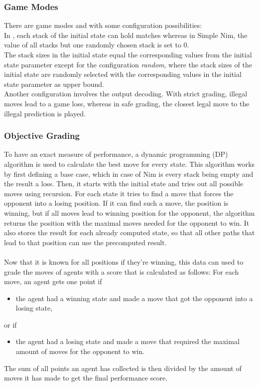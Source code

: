 \documentclass[11pt]{report}
\begin{document}
\begin{enumerate}
    \subsubsection{Game Modes}
    There are game modes  and  with some configuration possibilities:
    \\
    In , each stack of the initial state can hold matches whereas in Simple Nim, the value of all stacks but one randomly chosen stack is set to 0.
    \\
    The stack sizes in the initial state equal the corresponding values from the initial state parameter except for the configuration \textit{random}, where the stack sizes of the initial state are randomly selected with the corresponding values in the initial state parameter as upper bound.
    \\
    Another configuration involves the output decoding.
    With strict grading, illegal moves lead to a game loss, whereas in safe grading, the closest legal move to the illegal prediction is played.

    \subsubsection{Objective Grading}
    To have an exact measure of performance, a dynamic programming (DP) algorithm is used to calculate the best move for every state.
    This algorithm works by first defining a base case, which in case of Nim is every stack being empty and the result a loss.
    Then, it starts with the initial state and tries out all possible moves using recursion.
    For each state it tries to find a move that forces the opponent into a losing position.
    If it can find such a move, the position is winning, but if all moves lead to winning position for the opponent, the algorithm returns the position with the maximal moves needed for the opponent to win.
    It also stores the result for each already computed state, so that all other paths that lead to that position can use the precomputed result.
    \\ \\
    Now that it is known for all positions if they're winning, this data can used to grade the moves of agents with a score that is calculated as follows:
    For each move, an agent gets one point if
    \begin{itemize}
        \item the agent had a winning state and made a move that got the opponent into a losing state,
    \end{itemize}
    or if
    \begin{itemize}
        \item the agent had a losing state and made a move that required the maximal amount of moves for the opponent to win.
    \end{itemize}
    The sum of all points an agent has collected is then divided by the amount of moves it has made to get the final performance score.



\end{enumerate}
\end{document}
